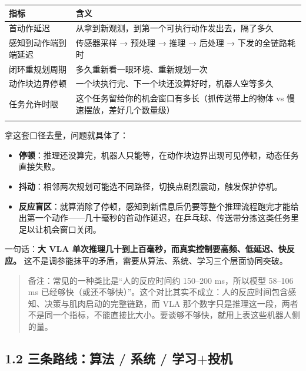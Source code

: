 \documentclass[
  chinese,
]{ctexart}
\providecommand{\tightlist}{%
  \setlength{\itemsep}{0pt}\setlength{\parskip}{0pt}}
\begin{document}
\begin{center}
\begin{tabular}{@{}>{\raggedright\arraybackslash}p{} >{\raggedright\arraybackslash}p{}@{}}
\toprule\noalign{}
指标 & 含义 \\
\midrule\noalign{}
首动作延迟 & 从拿到新观测，到第一个可执行动作发出去，隔了多久 \\
感知到动作端到端延迟 & 传感器采样 → 预处理 → 推理 → 后处理 → 下发的全链路耗时 \\
闭环重规划周期 & 多久重新看一眼环境、重新规划一次 \\
动作块边界停顿 & 一个块执行完、下一个块还没算好时，机器人空等多久 \\
任务允许时限 & 这个任务留给你的机会窗口有多长（抓传送带上的物体 vs 慢速摆放，差好几个数量级） \\
\bottomrule\noalign{}
\end{tabular}
\end{center}

拿这套口径去量，问题就具体了：

\begin{itemize}
\tightlist
\item
  \textbf{停顿}：推理还没算完，机器人只能等，在动作块边界出现可见停顿，动态任务直接失败。
\item
  \textbf{抖动}：相邻两次规划可能选不同路径，切换点剧烈震动，触发保护停机。
\item
  \textbf{反应盲区}：就算消除了停顿，感知到新信息后仍要等整个推理流程跑完才能给出第一个动作------几十毫秒的首动作延迟，在乒乓球、传送带分拣这类任务里足以让机会窗口关闭。
\end{itemize}

一句话：\textbf{大 VLA
单次推理几十到上百毫秒，而真实控制要高频、低延迟、快反应。}
这不是调参能抹平的矛盾，需要从算法、系统、学习三个层面协同突破。

\begin{quote}
备注：常见的一种类比是``人的反应时间约 150--200 ms，所以模型 58--106 ms
已经够快（或还不够快）''。这个对比其实不成立：人的反应时间包含感知、决策与肌肉启动的完整链路，而
VLA
那个数字只是推理这一段，两者不是同一个指标，不能直接比大小。要谈够不够快，就用上表这些机器人侧的量。
\end{quote}

\subsection{1.2 三条路线：算法 / 系统 /
学习+投机}\label{ux4e09ux6761ux8defux7ebfux7b97ux6cd5-ux7cfbux7edf-ux5b66ux4e60ux6295ux673a}
\end{document}

